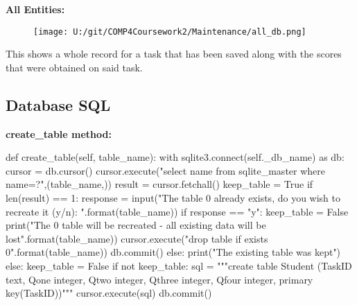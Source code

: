 \textbf{All Entities: }

\begin{figure}[H]
    \texttt{[image: U:/git/COMP4Coursework2/Maintenance/all\_db.png]}
    \label{fig:print_function_result}
\end{figure}

This shows a whole record for a task that has been saved along with the scores that were obtained on said task.

\subsection{Database SQL}

\textbf{create\_table method: }

\begin{python}
def create_table(self, table_name):
        with sqlite3.connect(self._db_name) as db:
            cursor = db.cursor()
            cursor.execute("select name from sqlite_master where name=?",(table_name,))
            result = cursor.fetchall()
            keep_table = True
            if len(result) == 1:
                response = input("The table {0} already exists, do you wish to recreate it (y/n): ".format(table_name))
                if response == "y":
                    keep_table = False
                    print("The {0} table will be recreated - all existing data will be lost".format(table_name))
                    cursor.execute("drop table if exists {0}".format(table_name))
                    db.commit()
                else:
                    print("The existing table was kept")
            else:
                keep_table = False
            if not keep_table:
                sql = """create table Student
                (TaskID text,
                Qone integer,
                Qtwo integer,
                Qthree integer,
                Qfour integer,
                primary key(TaskID))"""
                cursor.execute(sql)
                db.commit()
\end{python}

